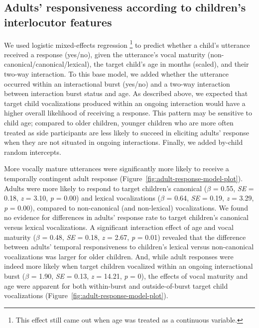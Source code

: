 \documentclass[
  man]{apa6}
\begin{document}
\hypertarget{adults-responsiveness-according-to-childrens-interlocutor-features}{%
\subsection{Adults' responsiveness according to children's interlocutor features}\label{adults-responsiveness-according-to-childrens-interlocutor-features}}

We used logistic mixed-effects regression \footnote{This effect still came out when age was treated as a continuous variable.} to predict whether a child's utterance received a response (yes/no), given the utterance's vocal maturity (non-canonical/canonical/lexical), the target child's age in months (scaled), and their two-way interaction. To this base model, we added whether the utterance occurred within an interactional burst (yes/no) and a two-way interaction between interaction burst status and age. As described above, we expected that target child vocalizations produced within an ongoing interaction would have a higher overall likelihood of receiving a response. This pattern may be sensitive to child age; compared to older children, younger children who are more often treated as side participants are less likely to succeed in eliciting adults' response when they are not situated in ongoing interactions. Finally, we added by-child random intercepts.

More vocally mature utterances were significantly more likely to receive a temporally contingent adult response (Figure~\ref{fig:adult-response-model-plot}). Adults were more likely to respond to target children's canonical (\(\beta\) = 0.55, \emph{SE} = 0.18, \emph{z} = 3.10, \emph{p} = 0.00) and lexical vocalizations (\(\beta\) = 0.64, \emph{SE} = 0.19, \emph{z} = 3.29, \emph{p} = 0.00), compared to non-canonical (and non-lexical) vocalizations. We found no evidence for differences in adults' response rate to target children's canonical versus lexical vocalizations. A significant interaction effect of age and vocal maturity (\(\beta\) = 0.48, \emph{SE} = 0.18, \emph{z} = 2.67, \emph{p} = 0.01) revealed that the difference between adults' temporal responsiveness to children's lexical versus non-canonical vocalizations was larger for older children. And, while adult responses were indeed more likely when target children vocalized within an ongoing interactional burst (\(\beta\) = 1.90, \emph{SE} = 0.13, \emph{z} = 14.21, \emph{p} = 0), the effects of vocal maturity and age were apparent for both within-burst and outside-of-burst target child vocalizations (Figure~\ref{fig:adult-response-model-plot}).
\end{document}
